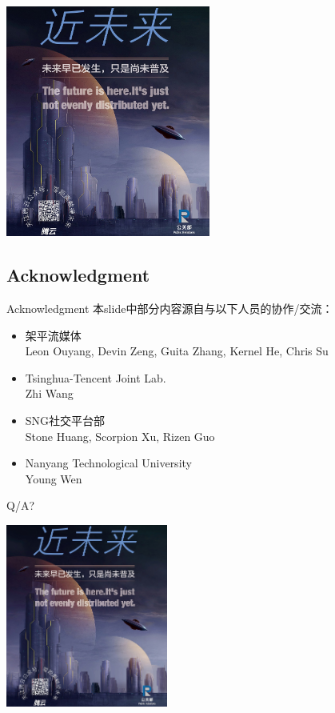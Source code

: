 \documentclass{beamer}
\begin{document}
\begin{frame}
\begin{center}
\includegraphics[height=7.6cm]{fig/tengyun.jpg}
\end{center}
\end{frame}
\subsection{Acknowledgment}
\begin{frame}{Acknowledgment}
本slide中部分内容源自与以下人员的协作/交流：
\begin{itemize}
\item 架平流媒体\\
Leon Ouyang, Devin Zeng, Guita Zhang, Kernel He, Chris Su
\item Tsinghua-Tencent Joint Lab.\\ 
Zhi Wang
\item SNG社交平台部\\
Stone Huang, Scorpion Xu, Rizen Guo
\item Nanyang Technological University\\
Young Wen
\end{itemize}
\end{frame}
\begin{frame}{Q/A?}
\begin{center}
\includegraphics[height=6.0cm]{fig/tengyun.jpg}
\end{center}
\end{frame}
\end{document}

